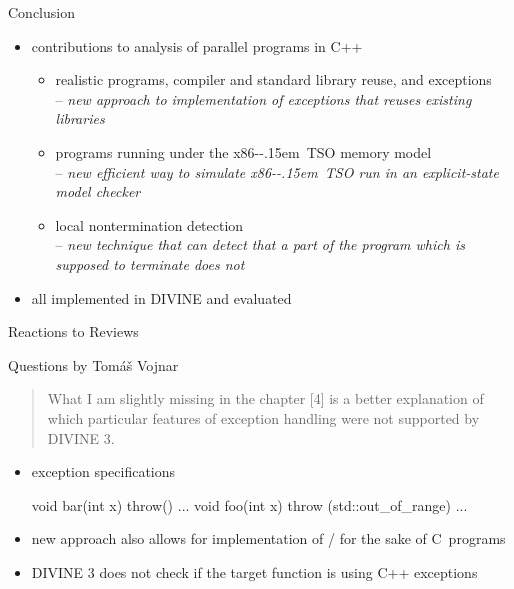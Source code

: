 \documentclass[aspectratio=169, fi]{paradise-slide}
\newcommand{\xtso}{\mbox{x86-\kern-.15em TSO}\xspace}
\newenvironment{prespart}[1]{%
  \begin{frame}{}%
    \centering
      {\Large #1} \par\bigskip\bigskip%
}{%
  \end{frame}%
}
\newcommand{\rquote}[1]{\begin{quote}#1\end{quote}\bigskip\setlength{\leftmargini}{1em}}
\begin{document}
\begin{prespart}{Conclusion}
  \begin{itemize}
    \item contributions to analysis of parallel programs in C++
      \begin{itemize}
        \item realistic programs, compiler and standard library reuse, and exceptions
          \\ – \emph{new approach to implementation of exceptions that reuses existing libraries}
          \medskip\pause
        \item programs running under the \xtso memory model
          \\ – \emph{new efficient way to simulate \xtso run in an explicit-state model checker}
          \medskip\pause
        \item local nontermination detection
          \\ – \emph{new technique that can detect that a part of the program which is supposed to
          terminate does not}
          \medskip\pause
      \end{itemize}
    \item all implemented in DIVINE and evaluated
  \end{itemize}
\end{prespart}

\def\insertframenumber{A}
\begin{frame}[noframenumbering]{}
    \centering
      {\Large Reactions to Reviews}
\end{frame}

\def\rname{Tomáš Vojnar}
\def\qtitle{Questions by \rname}

\begin{frame}{\qtitle}
\rquote{What I am slightly missing in the chapter [4] is a better explanation of which particular features
of exception handling were not supported by DIVINE 3.}

  \begin{itemize}
    \item exception specifications
      \begin{cppcode}
        void bar(int x) throw() { ... }
        void foo(int x) throw (std::out_of_range) { ... }
      \end{cppcode}
    \item new approach also allows for implementation of / for the sake of
      C~programs
    \item DIVINE 3 does not check if the target function is using C++ exceptions
  \end{itemize}
\end{frame}
\end{document}
